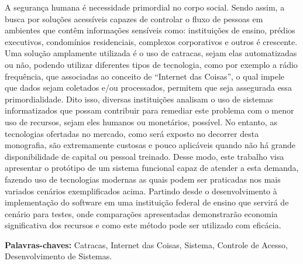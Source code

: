 \begin{resumo}



A segurança humana é necessidade primordial no corpo social. Sendo assim, a busca por soluções acessíveis capazes de controlar o fluxo de pessoas em ambientes que contêm informações sensíveis como: instituições de ensino, prédios executivos, condomínios residenciais, complexos corporativos e outros é crescente. Uma solução amplamente utilizada é o uso de catracas, sejam elas automatizadas ou não, podendo utilizar diferentes tipos de tecnologia, como por exemplo a rádio frequência, que associadas ao conceito de “Internet das Coisas”, o qual impele que dados sejam coletados e/ou processados, permitem que seja assegurada essa primordialidade. Dito isso, diversas instituições analisam o uso de sistemas informatizados que possam contribuir para remediar este problema com o menor uso de recursos, sejam eles humanos ou monetários, possível. No entanto, as tecnologias ofertadas no mercado, como será exposto no decorrer desta monografia, são extremamente custosas e pouco aplicáveis quando não há grande disponibilidade de capital ou pessoal treinado. Desse modo, este trabalho visa apresentar o protótipo de um sistema funcional capaz de atender a esta demanda, fazendo uso de tecnologias modernas as quais podem ser praticadas nos mais variados cenários exemplificados acima. Partindo desde o desenvolvimento à implementação do software em uma instituição federal de ensino que servirá de cenário para testes, onde comparações apresentadas demonstrarão economia significativa dos recursos e como este método pode ser utilizado com eficácia. 

\textbf{Palavras-chaves: } Catracas, Internet das Coisas, Sistema, Controle de Acesso, Desenvolvimento de Sistemas.

\end{resumo}
